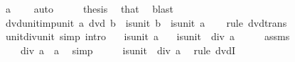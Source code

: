 \begin{isabellebody}
\ {\isachardoublequoteopen}a\ {\isasymnoteq}\ {}{\isachardoublequoteclose}\ \isamarkupfalse%
\ auto\isanewline
\ \ \isamarkupfalse%
\ \isamarkupfalse%
\ thesis\ \isamarkupfalse%
\ that\ \isamarkupfalse%
\ blast\isanewline
{}\isamarkupfalse%
%
\endisatagproof
{\isafoldproof}%
%
\isadelimproof
\isanewline
%
\endisadelimproof
\isanewline
{}\isamarkupfalse%
\ dvd{\isacharunderscore}{\kern0pt}unit{\isacharunderscore}{\kern0pt}imp{\isacharunderscore}{\kern0pt}unit{\isacharcolon}{\kern0pt}\ {\isachardoublequoteopen}a\ dvd\ b\ {\isasymLongrightarrow}\ is{\isacharunderscore}{\kern0pt}unit\ b\ {\isasymLongrightarrow}\ is{\isacharunderscore}{\kern0pt}unit\ a{\isachardoublequoteclose}\isanewline
%
\isadelimproof
\ \ %
\endisadelimproof
%
\isatagproof
{}\isamarkupfalse%
\ {\isacharparenleft}{\kern0pt}rule\ dvd{\isacharunderscore}{\kern0pt}trans{\isacharparenright}{\kern0pt}%
\endisatagproof
{\isafoldproof}%
%
\isadelimproof
\isanewline
%
\endisadelimproof
\isanewline
{}\isamarkupfalse%
\ unit{\isacharunderscore}{\kern0pt}div{\isacharunderscore}{\kern0pt}{}{\isacharunderscore}{\kern0pt}unit\ {\isacharbrackleft}{\kern0pt}simp{\isacharcomma}{\kern0pt}\ intro{\isacharbrackright}{\kern0pt}{\isacharcolon}{\kern0pt}\isanewline
\ \ \ {\isachardoublequoteopen}is{\isacharunderscore}{\kern0pt}unit\ a{\isachardoublequoteclose}\isanewline
\ \ \ {\isachardoublequoteopen}is{\isacharunderscore}{\kern0pt}unit\ {\isacharparenleft}{\kern0pt}{}\ div\ a{\isacharparenright}{\kern0pt}{\isachardoublequoteclose}\isanewline
%
\isadelimproof
%
\endisadelimproof
%
\isatagproof
{}\isamarkupfalse%
\ {\isacharminus}{\kern0pt}\isanewline
\ \ \isamarkupfalse%
\ assms\ \isamarkupfalse%
\ {\isachardoublequoteopen}{}\ {\isacharequal}{\kern0pt}\ {}\ div\ a\ {\isacharasterisk}{\kern0pt}\ a{\isachardoublequoteclose}\ \isamarkupfalse%
\ simp\isanewline
\ \ \isamarkupfalse%
\ \isamarkupfalse%
\ {\isachardoublequoteopen}is{\isacharunderscore}{\kern0pt}unit\ {\isacharparenleft}{\kern0pt}{}\ div\ a{\isacharparenright}{\kern0pt}{\isachardoublequoteclose}\ \isamarkupfalse%
\ {\isacharparenleft}{\kern0pt}rule\ dvdI{\isacharparenright}{\kern0pt}\isanewline
{}\isamarkupfalse%
%
\endisatagproof
{\isafoldproof}%
%
\isadelimproof
\isanewline

\end{isabellebody}
